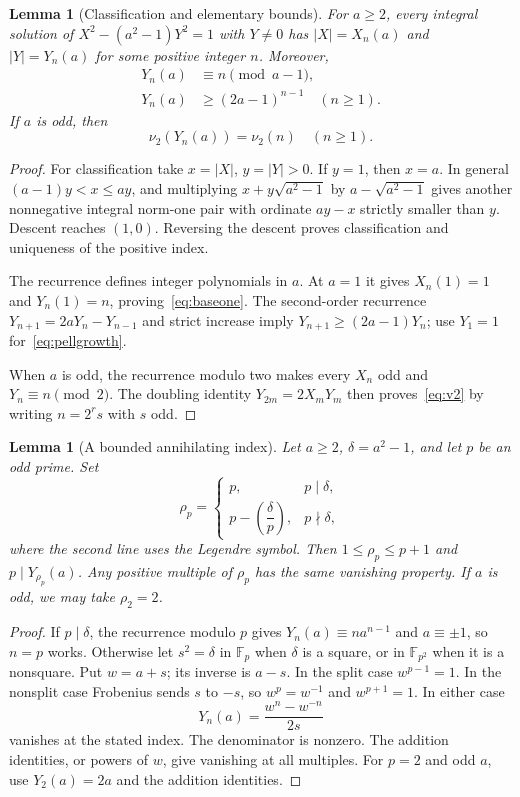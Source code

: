 \documentclass[11pt]{article}
\newtheorem{lemma}[theorem]{Lemma}
\theoremstyle{definition}
\theoremstyle{remark}
\newcommand{\vval}{\nu}
\begin{document}
\begin{lemma}[Classification and elementary bounds]\label{lem:pell}
For $a\ge2$, every integral solution of
$X^2-(a^2-1)Y^2=1$ with $Y\ne0$ has
$|X|=X_n(a)$ and $|Y|=Y_n(a)$ for some positive integer $n$.
Moreover,
\begin{align}
 Y_n(a)&\equiv n\pmod{a-1},\label{eq:baseone}\\
 Y_n(a)&\ge(2a-1)^{n-1}\quad(n\ge1).\label{eq:pellgrowth}
\end{align}
If $a$ is odd, then
\begin{equation}\label{eq:v2}
 \vval_2(Y_n(a))=\vval_2(n)\quad(n\ge1).
\end{equation}
\end{lemma}
\begin{proof}
For classification take $x=|X|$, $y=|Y|>0$. If $y=1$, then $x=a$.
In general $(a-1)y<x\le ay$, and multiplying $x+y\sqrt{a^2-1}$ by
$a-\sqrt{a^2-1}$ gives another nonnegative integral norm-one pair with
ordinate $ay-x$ strictly smaller than $y$. Descent reaches $(1,0)$.
Reversing the descent proves classification and uniqueness of the positive
index.

The recurrence defines integer polynomials in $a$. At $a=1$ it gives
$X_n(1)=1$ and $Y_n(1)=n$, proving~\eqref{eq:baseone}. The second-order
recurrence
$Y_{n+1}=2aY_n-Y_{n-1}$ and strict increase imply
$Y_{n+1}\ge(2a-1)Y_n$; use $Y_1=1$ for~\eqref{eq:pellgrowth}.

When $a$ is odd, the recurrence modulo two makes every $X_n$ odd and
$Y_n\equiv n\pmod2$. The doubling identity
$Y_{2m}=2X_mY_m$ then proves~\eqref{eq:v2} by writing $n=2^r s$ with
$s$ odd.
\end{proof}

\begin{lemma}[A bounded annihilating index]\label{lem:annihilator}
Let $a\ge2$, $\delta=a^2-1$, and let $p$ be an odd prime. Set
\[
 \rho_p=
 \begin{cases}
  p,&p\mid\delta,\\
  p-\left(\dfrac{\delta}{p}\right),&p\nmid\delta,
 \end{cases}
\]
where the second line uses the Legendre symbol. Then
$1\le\rho_p\le p+1$ and $p\mid Y_{\rho_p}(a)$. Any positive multiple
of $\rho_p$ has the same vanishing property. If $a$ is odd, we may take
$\rho_2=2$.
\end{lemma}
\begin{proof}
If $p\mid\delta$, the recurrence modulo $p$ gives
$Y_n(a)\equiv n a^{n-1}$ and $a\equiv\pm1$, so $n=p$ works.
Otherwise let $s^2=\delta$ in $\mathbb F_p$ when $\delta$ is a square,
or in $\mathbb F_{p^2}$ when it is a nonsquare. Put $w=a+s$; its
inverse is $a-s$. In the split case $w^{p-1}=1$. In the nonsplit case
Frobenius sends $s$ to $-s$, so $w^p=w^{-1}$ and $w^{p+1}=1$.
In either case
\[
 Y_n(a)=\frac{w^n-w^{-n}}{2s}
\]
vanishes at the stated index. The denominator is nonzero. The addition
identities, or powers of $w$, give vanishing at all multiples.
For $p=2$ and odd $a$, use $Y_2(a)=2a$ and the addition identities.
\end{proof}
\end{document}
